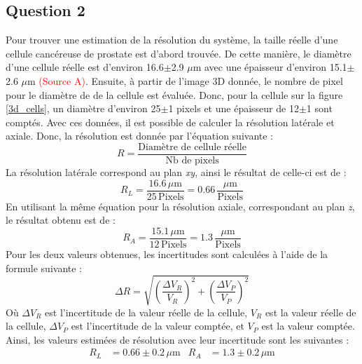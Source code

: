 \documentclass[11pt,letterpaper]{article}
\begin{document}
\subsection{Question 2}
Pour trouver une estimation de la résolution du système, la taille réelle d'une cellule cancéreuse de prostate est d'abord trouvée. De cette manière, le diamètre d'une cellule réelle est d'environ 16.6$\pm$2.9 $\mu$m avec une épaisseur d'environ 15.1$\pm$2.6 $\mu$m  \textcolor{red}{(Source A)}. Ensuite, à partir de l'image 3D donnée, le nombre de pixel pour le diamètre de de la cellule est évaluée. Donc, pour la cellule sur la figure \ref{3d_cells}, un diamètre d'environ 25$\pm$1 pixels et une épaisseur de 12$\pm$1 sont comptés. Avec ces données, il est possible de calculer la résolution latérale et axiale. Donc, la résolution est donnée par l'équation suivante :
\begin{equation}
  R=\frac{\text{Diamètre de cellule réelle}}{\text{Nb de pixels}}
\end{equation}
La résolution latérale correspond au plan \textit{xy}, ainsi le résultat de celle-ci est de :
\begin{equation}
  R_{L}=\frac{16.6\,\mu\mathrm{m}}{25\,\mathrm{Pixels}}=0.66\,\frac{\mu\mathrm{m}}{\mathrm{Pixels}}
\end{equation}
En utilisant la même équation pour la résolution axiale, correspondant au plan \textit{z}, le résultat obtenu est de :
\begin{equation}
  R_{A}=\frac{15.1\,\mu\mathrm{m}}{12\,\mathrm{Pixels}}=1.3\,\frac{\mu\mathrm{m}}{\mathrm{Pixels}}
\end{equation}
Pour les deux valeurs obtenues, les incertitudes sont calculées à l'aide de la formule suivante :
\begin{equation}
  \Delta R=\sqrt{\left(\frac{\Delta V_{R}}{V_{R}}\right)^{2}+\left(\frac{\Delta V_{P}}{V_{P}}\right)^{2}}
\end{equation}
Où $\Delta V_{R}$ est l'incertitude de la valeur réelle de la cellule, $V_{R}$ est la valeur réelle de la cellule, $\Delta V_{P}$ est l'incertitude de la valeur comptée, et $V_{P}$ est la valeur comptée. Ainsi, les valeurs estimées de résolution avec leur incertitude sont les suivantes :
\begin{align*}
  R_{L}&=0.66\pm0.2\,\mu\mathrm{m} & R_{A}&=1.3\pm0.2\,\mu\mathrm{m} \\
\end{align*}


\end{document}
